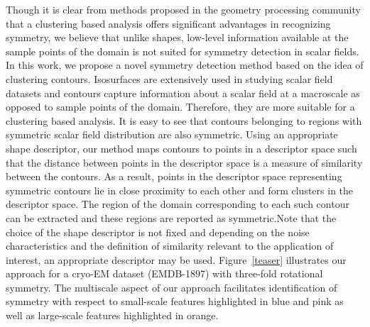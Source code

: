 \documentclass[review,journal]{vgtc}         %
\begin{document}
Though it is clear from methods proposed in the geometry processing community
that a clustering based analysis offers significant advantages in recognizing symmetry,
we believe that unlike shapes, low-level information available at the sample points of the 
domain is not suited for symmetry detection in scalar fields. In this work, we propose 
a novel symmetry detection method based on the idea of clustering contours. Isosurfaces
are extensively used in studying scalar field datasets and contours capture information 
about a scalar field at a macroscale as opposed to sample points of the domain. Therefore, they
are more suitable for a clustering based analysis. It is easy to see that contours
belonging to regions with symmetric scalar field distribution are also symmetric. Using an 
appropriate shape descriptor, our method maps contours to points in a descriptor space 
such that the distance between points in the descriptor space is a measure of similarity 
between the contours. As a result, points in the descriptor space 
representing symmetric contours lie in close 
proximity to each other and form clusters in the descriptor space. The region of the domain
corresponding to each such contour can be extracted and these regions
are reported as symmetric.Note that the choice
of the shape descriptor is not fixed and depending on the noise characteristics and the definition
of similarity relevant to the application of interest, an appropriate descriptor may be used.
Figure~\ref{teaser} illustrates our approach for a cryo-EM dataset (EMDB-1897) 
with three-fold rotational symmetry. The multiscale aspect of our approach facilitates
identification of symmetry with respect to small-scale features highlighted in blue and pink
as well as large-scale features highlighted in orange.
\end{document}
